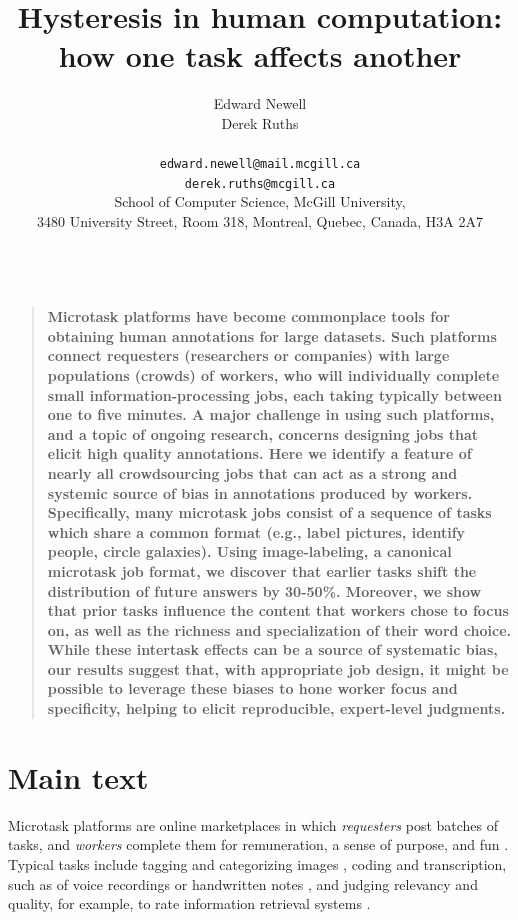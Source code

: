 \documentclass[12pt]{article}
\title{Hysteresis in human computation:\\ how one task affects another}
\author
{Edward Newell \\ Derek Ruths\\
\\
\normalsize{\texttt{edward.newell@mail.mcgill.ca}}\\
\normalsize{\texttt{derek.ruths@mcgill.ca}}\\
\normalsize{School of Computer Science, McGill University,}\\
\normalsize{3480 University Street, Room 318, Montreal, Quebec, Canada, H3A 2A7}\\
\\
}
\date{}
\newenvironment{sciabstract}{%
\begin{quote} \bf}
{\end{quote}}
\begin{document}
 


\baselineskip24pt


\maketitle 




\begin{sciabstract}
Microtask platforms have become commonplace tools for obtaining human 
annotations for large datasets.  Such platforms connect requesters 
(researchers or companies) with large populations (crowds) of workers, who 
will individually complete small information-processing jobs, each taking 
typically between one to five minutes.  
A major challenge in using such platforms, 
and a topic of ongoing research, concerns designing jobs that elicit high 
quality annotations. Here we identify a feature of nearly all crowdsourcing 
jobs that can act as a strong and systemic source of bias in annotations 
produced by workers. Specifically, many microtask jobs consist of a sequence 
of tasks which share a common format (e.g., label pictures, identify people, 
circle galaxies). Using image-labeling, a canonical microtask job format, we 
discover that earlier tasks shift the distribution of future answers by 
30-50\%. 
Moreover, we show that prior tasks influence 
the content that workers chose to focus on, as well as the richness and 
specialization of their word choice. While these intertask effects can be a 
source of systematic bias, our results suggest that, with appropriate job 
design, it might be possible to leverage these biases to hone worker focus 
and specificity, helping to elicit reproducible, expert-level judgments.
\end{sciabstract}

\section*{Main text}
Microtask platforms are online marketplaces in which \textit{requesters} 
post batches of tasks, and \textit{workers} complete them
for remuneration, a sense of purpose, and fun
\cite{kazai2013analysis,Antin20122925}.
Typical tasks include tagging and categorizing images 
\cite{6116320,Zhai2012357}, coding and transcription, such as of voice recordings or handwritten notes
\cite{chandler2013breaking,paolacci2010running,Berinsky2012351,Finnerty2013}, 
and judging relevancy and quality, for example, to rate information 
retrieval systems \cite{le2010ensuring,grady2010crowdsourcing,alonso2009can,kazai2013analysis}.
\end{document}
